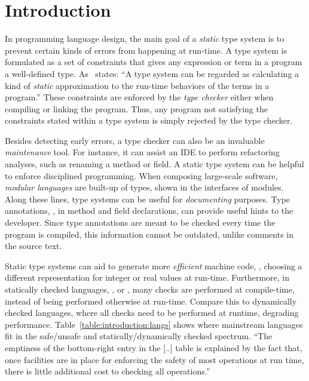 \chapter{Introduction}

In programming language design, the main goal of a \emph{static} type system is to prevent certain kinds of errors from happening at run-time.
A type system is formulated as a set of constraints that gives any expression or term in a program a well-defined type.
As~\cite{pierceTypesProgrammingLanguages2002} states:
``A type system can be regarded as calculating a kind of \emph{static} approximation to the run-time behaviors of the terms in a program.''
These constraints are enforced by the \emph{type checker} either when compiling or linking the program.
Thus, any program not satisfying the constraints stated within a type system is simply rejected by the type checker.

Besides detecting early errors,
a type checker can also be an invaluable \emph{maintenance} tool.
For instance, it can assist an IDE to perform refactoring analyses,
such as renaming a method or field.
A static type system can be helpful to enforce disciplined programming.
When composing large-scale software,
\emph{modular languages} are built-up of types,
shown in the interfaces of modules.
Along these lines,
type systems can be useful for \emph{documenting} purposes.
Type annotations, \eg{}, in method and field declarations,
can provide useful hints to the developer.
Since type annotations are meant to be checked every time the program is compiled,
this information cannot be outdated, unlike comments in the source text.

Static type systems can aid to generate more \emph{efficient} machine code, \eg{},
choosing a different representation for integer or real values at run-time.
Furthermore, in statically checked languages, \eg{}, \java{} or \rust{},
many checks are performed at compile-time,
instead of being performed otherwise at run-time.
Compare this to dynamically checked languages,
where all checks need to be performed at runtime,
degrading performance.
Table~\ref{table:introduction:langs} shows where mainstream languages fit in the safe/unsafe and statically/dynamically checked spectrum.
``The emptiness of the bottom-right entry in the [..] table is explained by the fact that,
once facilities are in place for enforcing the safety of most operations at run time,
there is little additional cost to checking all operations.''~\citep{pierceTypesProgrammingLanguages2002}

